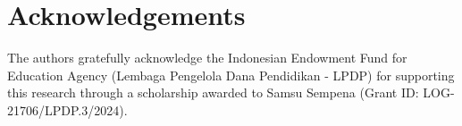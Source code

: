 \section*{Acknowledgements}
The authors gratefully acknowledge the Indonesian Endowment Fund for Education Agency (Lembaga Pengelola Dana Pendidikan - LPDP) for supporting this research through a scholarship awarded to Samsu Sempena (Grant ID: LOG-21706/LPDP.3/2024).